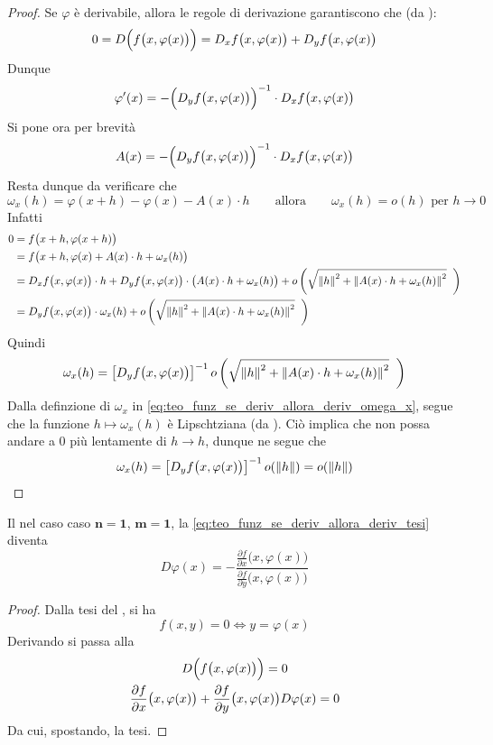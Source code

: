 \begin{theorem}
\begin{proof}
		Se $\varphi$ è derivabile, allora le regole di derivazione garantiscono che (da ):
		\[0 = D \Bigl( f \bigl( x, \varphi(x) \bigr) \Bigr) = D_xf \bigl( x, \varphi(x) \bigr) + D_yf \bigl( x, \varphi(x) \bigr)\]
		Dunque
		\[\varphi'(x) = -\Bigl( D_yf \bigl( x, \varphi(x) \bigr) \Bigr)^{-1} \cdot D_xf \bigl( x, \varphi(x) \bigr)\]
		Si pone ora per brevità
		\[A(x) = - \Bigl( D_yf \bigl( x, \varphi(x) \bigr) \Bigr)^{-1} \cdot D_xf \bigl( x, \varphi(x) \bigr)\]
		Resta dunque da verificare che
		\begin{equation}
			\label{eq:teo_funz_se_deriv_allora_deriv_omega_x}
			\omega_x(h) = \varphi(x + h) - \varphi(x) - A(x) \cdot h \qquad \text{allora} \qquad \omega_x(h) = o(h) \text{ per } h \to 0
		\end{equation}
		Infatti
		\begin{align*}
			0 &= f \bigl( x + h, \varphi(x + h) \bigr)\\
			&= f \bigl( x + h, \varphi(x) + A(x) \cdot h + \omega_x(h) \bigr)\\
			&= D_xf \bigl( x, \varphi(x) \bigr) \cdot h + D_yf \bigl( x, \varphi(x) \bigr) \cdot \bigl( A(x) \cdot h + \omega_x(h) \bigr) + o \left( \sqrt{ \left\|h\right\|^2 + \left\|A(x) \cdot h + \omega_x(h)\right\|^2 } \;\; \right)\\
			&= D_yf \bigl( x, \varphi(x) \bigr) \cdot \omega_x(h) + o \left( \sqrt{ \left\|h\right\|^2 + \left\|A(x) \cdot h + \omega_x(h)\right\|^2 } \;\; \right)
		\end{align*}
		Quindi
		\[\omega_x(h) = \left[ D_yf \bigl( x, \varphi(x) \bigr) \right]^{-1} o \left( \sqrt{ \left\|h\right\|^2 + \left\|A(x) \cdot h + \omega_x(h)\right\|^2 } \;\; \right)\]
		Dalla definzione di $\omega_x$ in \cref{eq:teo_funz_se_deriv_allora_deriv_omega_x}, segue che la funzione $h \mapsto \omega_x(h)$ è Lipschtziana (da ). Ciò implica che non possa andare a $0$ più lentamente di $h \to h$, dunque ne segue che
		\[\omega_x(h) = \left[ D_yf \bigl( x, \varphi(x) \bigr) \right]^{-1} o(\left\|h\right\|) = o(\left\|h\right\|)\]
		\cbend
	\end{proof}
\end{theorem}
\begin{corollary}[Caso $n=1$, $m=1$]
	Il  nel caso caso $\boldsymbol{n=1}$, $\boldsymbol{m=1}$, la \cref{eq:teo_funz_se_deriv_allora_deriv_tesi} diventa
	\[D\varphi(x) = -\frac{\frac{\partial f}{\partial x}\bigl( x, \varphi(x) \bigr)}{\frac{\partial f}{\partial y}\bigl( x, \varphi(x) \bigr)}\]
	\begin{proof}
		Dalla tesi del , si ha
		\[f(x,y) = 0 \iff y = \varphi(x)\]
		Derivando si passa alla
		\[
			\begin{gathered}
				D\Bigl( f\bigl(x,\varphi(x) \bigr) \Bigr) = 0\\
				\frac{\partial f}{\partial x}\bigl( x, \varphi(x) \bigr) + \frac{\partial f}{\partial y}\bigl( x, \varphi(x) \bigr) D\varphi(x) = 0
			\end{gathered}
		\]
		Da cui, spostando, la tesi.
	\end{proof}
\end{corollary}
